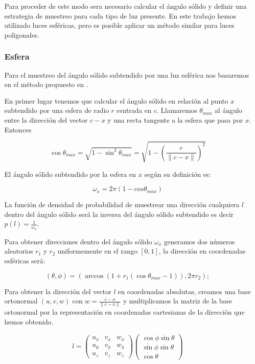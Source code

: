 \medskip

Para proceder de este modo sera necesario calcular el ángulo sólido y definir una estrategia de muestreo para cada tipo de luz presente. En este trabajo hemos utilizado luces esféricas, pero es posible aplicar un método similar para luces poligonales.

\subsubsection{Esfera}

Para el muestreo del ángulo sólido subtendido por una luz esférica nos basaremos en el método propuesto en \cite{Shirley1996}.

\medskip

En primer lugar tenemos que calcular el ángulo sólido en relación al punto $x$ subtendido por una esfera de radio $r$ centrada en $c$. Llamaremos $\theta_{max}$ al ángulo entre la dirección del vector $c - x$ y una recta tangente a la esfera que pasa por $x$. Entonces

\begin{equation}
\cos \theta_{max} = \sqrt{1 - \sin^2 \theta_{max}} = \sqrt{ 1 - \left(\frac{r}{\lVert c - x \rVert} \right)^2 }
\end{equation}

El ángulo sólido subtendido por la esfera en $x$ según su definición es:

\begin{equation}
\omega_x = 2\pi (1 - cos \theta_{max})
\end{equation}

La función de densidad de probabilidad de muestrear una dirección cualquiera $l$ dentro del ángulo sólido será la inversa del ángulo sólido subtendido es decir $p(l) = \frac{1}{\omega_x}$.

\medskip

Para obtener direcciones dentro del ángulo sólido $\omega_x$ generamos dos números aleatorios $r_1$ y $r_2$ uniformemente en el rango $[0, 1]$, la dirección en coordenadas esféricas será:

\begin{equation}
(\theta, \phi) = (\arccos (1 + r_1 (\cos \theta_{max} - 1)), 2\pi r_2);
\end{equation}

\clearpage

Para obtener la dirección del vector $l$ en coordenadas absolutas, creamos una base ortonormal $(u, v, w)$ con $w = \frac{c - x}{\lVert c - x \rVert}$ y multiplicamos la matriz de la base ortonormal por la representación en coordenadas cartesianas de la dirección que hemos obtenido.

\begin{equation}
l = \begin{pmatrix}
u_x & v_x & w_x \\
u_y & v_y & w_y \\
u_z & v_z & w_z
\end{pmatrix}
\begin{pmatrix}
\cos \phi \sin \theta \\
\sin \phi \sin \theta \\
\cos \theta
\end{pmatrix}
\end{equation}





